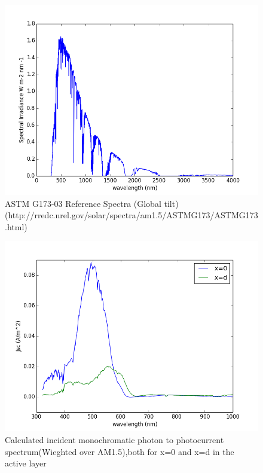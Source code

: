 \documentclass{article}
\begin{document}
\begin{figure}[h!]
  \centering
    \includegraphics[width=1\textwidth]{AM15}
  \caption{
ASTM G173-03 Reference Spectra (Global
tilt)(http://rredc.nrel.gov/solar/spectra/am1.5/ASTMG173/ASTMG173.html) }
  \label{AM15}
\end{figure}
\begin{figure}[h!]
  \centering
    \includegraphics[width=1\textwidth]{Jphton0d}
  \caption{Calculated incident monochromatic photon to photocurrent
  spectrum(Wieghted over AM1.5),both for x=0 and x=d in the active layer }
  \label{Jphton0d}
\end{figure}
\end{document}
